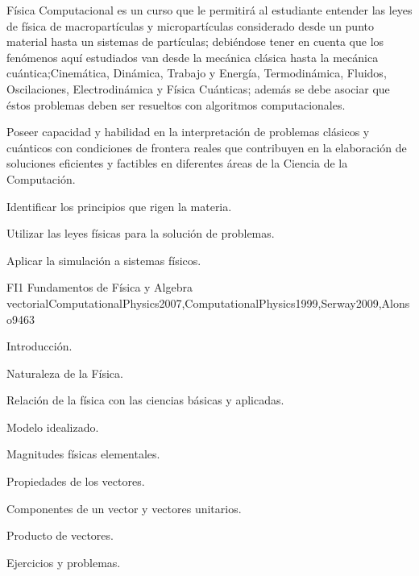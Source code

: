 \begin{syllabus}


\begin{justification}
Física Computacional es un curso que le permitirá al estudiante entender
las leyes de física de macropartículas y micropartículas considerado desde un
punto material hasta un sistemas de partículas; debiéndose tener en cuenta que los
fenómenos aquí estudiados van desde la mecánica clásica hasta la mecánica cuántica;Cinemática, Dinámica, Trabajo y Energía, Termodinámica, Fluidos, Oscilaciones, Electrodinámica y Física Cuánticas; 
además se debe asociar que éstos problemas deben ser resueltos con algoritmos computacionales.

Poseer capacidad y habilidad en la interpretación de problemas clásicos y cuánticos 
con condiciones de frontera reales que contribuyen en la elaboración de soluciones eficientes
y factibles en diferentes áreas de la Ciencia de la Computación.
\end{justification}

\begin{goals}
\item Identificar los principios que rigen la materia.
\item Utilizar las leyes físicas para la solución de problemas.
\item Aplicar la simulación a sistemas físicos.
\end{goals}

\begin{outcomes}
\end{outcomes}

\begin{unit}{FI1 Fundamentos de Física y Algebra vectorial}{ComputationalPhysics2007,ComputationalPhysics1999,Serway2009,Alonso94}{6}{3}
\begin{topics}
      \item Introducción.
      \item Naturaleza de la Física.
      \item Relación de la física con las ciencias básicas y aplicadas.
      \item Modelo idealizado.
      \item Magnitudes físicas  elementales.
      \item Propiedades de los vectores.
      \item Componentes de un vector y vectores unitarios.
      \item Producto de vectores.
      \item Ejercicios y problemas.
   \end{topics}


\end{unit}
\end{syllabus}

